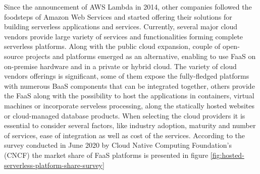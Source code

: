 Since the announcement of AWS Lambda in 2014, other companies followed the foodsteps of Amazon Web Services and started offering their solutions for building serverless applications and services. Currently, several major cloud vendors provide large variety of services and functionalities forming complete serverless platforms. Along with the public cloud expansion, couple of open-source projects and platforms emerged as an alternative, enabling to use FaaS on on-premise hardware and in a private or hybrid cloud. The variety of cloud vendors offerings is significant, some of them expose the fully-fledged platforms with numerous BaaS components that can be integrated together, others provide the FaaS along with the possibility to host the applications in containers, virtual machines or incorporate serveless processing, along the statically hosted websites or cloud-managed database products. When selecting the cloud providers it is essential to consider several factors, like industry adoption, maturity and number of services, ease of integration as well as cost of the services. According to the survey conducted in June 2020 by Cloud Native Computing Foundation's (CNCF) \cite{CNCFServerlessSurvey2020} the market share of FaaS platforms is presented in figure \ref{fig:hosted-serverless-platform-share-survey}



